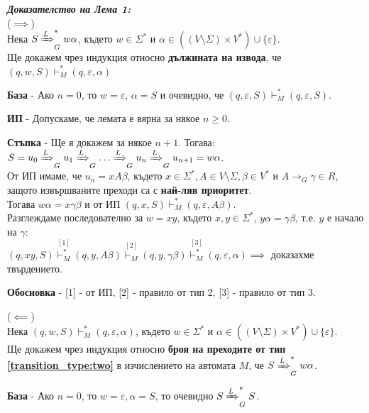 \documentclass[fleqn,12pt]{article}
\begin{document}
\begin{flushleft}
\textit{\textbf{Доказателство на Лема 1:}} \\

($\implies$) \\
Нека $S \xRightarrow[]{L}_G^* w\alpha$, където $w \in \Sigma^*$ и $\alpha \in ((V \setminus \Sigma) \times V^*) \cup \{\varepsilon\}$. \\
Ще докажем чрез индукция относно \textbf{дължината на извода}, че $(q, w, S) \vdash_M^* (q, \varepsilon, \alpha)$

\textbf{База} - Ако $n = 0$, то $w=\varepsilon$, $\alpha = S$ и очевидно, че $(q, \varepsilon, S) \vdash_M^* (q, \varepsilon, S)$.

\textbf{ИП} - Допускаме, че лемата е вярна за някое $n \geq 0$.

\textbf{Стъпка} - Ще я докажем за някое $n + 1$. Тогава: \\

$S = u_0 \xRightarrow[]{L}_G u_1 \xRightarrow[]{L}_G \dots \xRightarrow[]{L}_G u_n \xRightarrow[]{L}_G u_{n+1} = w\alpha$. \\
От ИП имаме, че $u_n = xA\beta$, където $x \in \Sigma^*, A \in V \setminus \Sigma, \beta \in V^*$ и $A \to_G \gamma \in R$, защото извършваните преходи са с \textbf{най-ляв приоритет}. \\
Тогава $w\alpha = x\gamma\beta$ и от ИП $(q, x, S) \vdash_M^* (q, \varepsilon, A\beta)$. \\
Разглеждаме последователно за $w = xy$, където $x, y \in \Sigma^*$, $y\alpha = \gamma\beta$, т.е. $y$ е начало на $\gamma$: \\

$(q, xy, S) \overset{[1]}{\vdash_M^*} (q, y, A\beta) \overset{[2]}{\vdash_M} (q, y, \gamma\beta) \overset{[3]}{\vdash_M^*} (q, \varepsilon, \alpha)
\implies$ доказахме твърдението.

\textbf{Обосновка} - [1] - от ИП, [2] - правило от тип 2, [3] - правило от тип 3. 

($\impliedby$) \\
Нека $(q, w, S) \vdash_M^* (q, \varepsilon, \alpha)$, където $w \in \Sigma^*$ и $\alpha \in ((V \setminus \Sigma) \times V^*) \cup \{\varepsilon\}$. \\
Ще докажем чрез индукция относно \textbf{броя на преходите от тип \ref{transition_type:two}} в изчислението на автомата $M$, че $S \xRightarrow[]{L}_G^* w\alpha$.

\textbf{База} - Ако $n = 0$, то $w = \varepsilon, \alpha = S$, то очевидно $S \xRightarrow[]{L}_G^* S$.


\end{flushleft}
\end{document}
